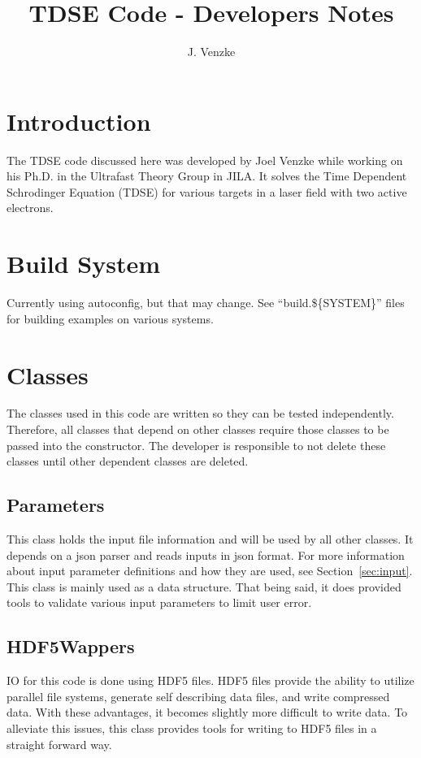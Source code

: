 \documentclass{article}
\title{TDSE Code - Developers Notes}
\author{J. Venzke}
\begin{document}
\maketitle
\section{Introduction} %
\label{sec:introduction}
The TDSE code discussed here was developed by Joel Venzke while working on his Ph.D. in the Ultrafast Theory Group in JILA. It solves the Time Dependent Schrodinger Equation (TDSE) for various targets in a laser field with two active electrons.

\section{Build System} %
\label{sec:build_system}
Currently using autoconfig, but that may change. See ``build.\$\{SYSTEM\}'' files for building examples on various systems. 

\section{Classes} %
\label{sec:classes}

The classes used in this code are written so they can be tested independently. Therefore, all classes that depend on other classes require those classes to be passed into the constructor. The developer is responsible to not delete these classes until other dependent classes are deleted.

\subsection{Parameters} %
\label{sub:parameters}
This class holds the input file information and will be used by all other classes. It depends on a json parser and reads inputs in json format. For more information about input parameter definitions and how they are used, see Section~\ref{sec:input}. This class is mainly used as a data structure. That being said, it does provided tools to validate various input parameters to limit user error.


\subsection{HDF5Wappers} %
\label{sub:hdf5wappers}
IO for this code is done using HDF5 files. HDF5 files provide the ability to utilize parallel file systems, generate self describing data files, and write compressed data. With these advantages, it becomes slightly more difficult to write data. To alleviate this issues, this class provides tools for writing to HDF5 files in a straight forward way.
\end{document}
